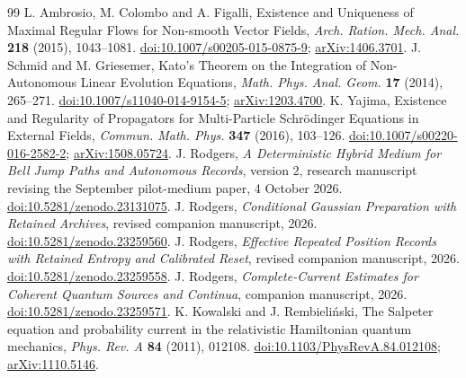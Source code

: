 \documentclass[11pt]{article}
\numberwithin{equation}{section}
\theoremstyle{definition}
\theoremstyle{remark}
\begin{document}
\begin{thebibliography}{99}
 L. Ambrosio, M. Colombo and A. Figalli, Existence and Uniqueness of Maximal Regular Flows for Non-smooth Vector Fields, \emph{Arch. Ration. Mech. Anal.} \textbf{218} (2015), 1043--1081. \href{https://doi.org/10.1007/s00205-015-0875-9}{doi:10.1007/s00205-015-0875-9}; \href{https://arxiv.org/abs/1406.3701}{arXiv:1406.3701}.
 J. Schmid and M. Griesemer, Kato's Theorem on the Integration of Non-Autonomous Linear Evolution Equations, \emph{Math. Phys. Anal. Geom.} \textbf{17} (2014), 265--271. \href{https://doi.org/10.1007/s11040-014-9154-5}{doi:10.1007/s11040-014-9154-5}; \href{https://arxiv.org/abs/1203.4700}{arXiv:1203.4700}.
 K. Yajima, Existence and Regularity of Propagators for Multi-Particle Schr\"odinger Equations in External Fields, \emph{Commun. Math. Phys.} \textbf{347} (2016), 103--126. \href{https://doi.org/10.1007/s00220-016-2582-2}{doi:10.1007/s00220-016-2582-2}; \href{https://arxiv.org/abs/1508.05724}{arXiv:1508.05724}.
 J. Rodgers, \emph{A Deterministic Hybrid Medium for Bell Jump Paths and Autonomous Records}, version 2, research manuscript revising the September pilot-medium paper, 4 October 2026. \href{https://doi.org/10.5281/zenodo.23131075}{doi:10.5281/zenodo.23131075}.
 J. Rodgers, \emph{Conditional Gaussian Preparation with Retained Archives}, revised companion manuscript, 2026. \href{https://doi.org/10.5281/zenodo.23259560}{doi:10.5281/zenodo.23259560}.
 J. Rodgers, \emph{Effective Repeated Position Records with Retained Entropy and Calibrated Reset}, revised companion manuscript, 2026. \href{https://doi.org/10.5281/zenodo.23259558}{doi:10.5281/zenodo.23259558}.
 J. Rodgers, \emph{Complete-Current Estimates for Coherent Quantum Sources and Continua}, companion manuscript, 2026. \href{https://doi.org/10.5281/zenodo.23259571}{doi:10.5281/zenodo.23259571}.
 K. Kowalski and J. Rembieli\'nski, The Salpeter equation and probability current in the relativistic Hamiltonian quantum mechanics, \emph{Phys. Rev. A} \textbf{84} (2011), 012108. \href{https://doi.org/10.1103/PhysRevA.84.012108}{doi:10.1103/PhysRevA.84.012108}; \href{https://arxiv.org/abs/1110.5146}{arXiv:1110.5146}.
\end{thebibliography}
\end{document}
